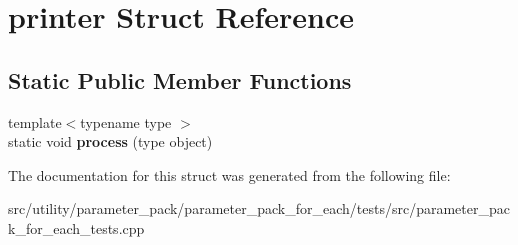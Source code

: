 \hypertarget{structprinter}{\section{printer Struct Reference}
\label{structprinter}
}
\subsection*{Static Public Member Functions}
\begin{DoxyCompactItemize}
\item 
\hypertarget{structprinter_a65d06f6b703eabfd57600550b27ef2ff}{{\footnotesize template$<$typename type $>$ }\\static void {\bfseries process} (type object)}\label{structprinter_a65d06f6b703eabfd57600550b27ef2ff}

\end{DoxyCompactItemize}


The documentation for this struct was generated from the following file\-:\begin{DoxyCompactItemize}
\item 
src/utility/parameter\-\_\-pack/parameter\-\_\-pack\-\_\-for\-\_\-each/tests/src/parameter\-\_\-pack\-\_\-for\-\_\-each\-\_\-tests.\-cpp\end{DoxyCompactItemize}
